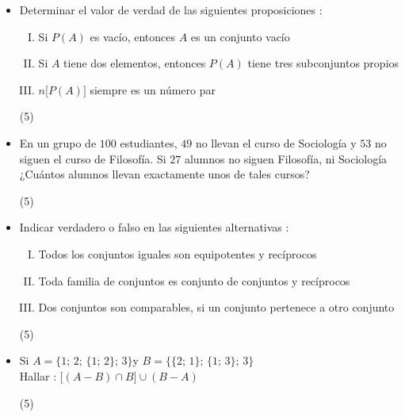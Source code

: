 \documentclass[11pt, twocolumn, landscape, a4paper]{article}
\begin{document}
\begin{itemize}
\item{Determinar el valor de verdad de las siguientes proposiciones :
\begin{enumerate}[I.]
\item{Si $P(A)$ es vacío, entonces $A$ es un conjunto vacío}
\item{Si $A$ tiene dos elementos, entonces $P(A)$ tiene tres subconjuntos propios}
\item{$n\big[P(A)\big]$ siempre es un número par}
\end{enumerate}
\begin{tasks}(5)
\end{tasks}}
\item{En un grupo de $100$ estudiantes, $49$ no llevan el curso de Sociología y $53$ no siguen el curso de Filosofía. Si $27$ alumnos no siguen Filosofía, ni Sociología ¿Cuántos alumnos llevan exactamente unos de tales cursos?
\begin{tasks}(5)
\end{tasks}}
\item{Indicar verdadero o falso en las siguientes alternativas :
\begin{enumerate}[I.]
\item{Todos los conjuntos iguales son equipotentes y recíprocos}
\item{Toda familia de conjuntos es conjunto de conjuntos y recíprocos}
\item{Dos conjuntos son comparables, si un conjunto pertenece a otro conjunto}
\end{enumerate}
\begin{tasks}(5)
\end{tasks}}
\item{Si \quad$A = \{1;\,2;\,\{1;\,2\};\,3\}$\quad y \quad$B = \{\{2;\,1\};\,\{1;\,3\};\,3\}$ \\ Hallar : $\big[(A - B) \cap B\big] \cup (B - A)$
\begin{tasks}(5)
\end{tasks}}
\end{itemize}
\end{document}

